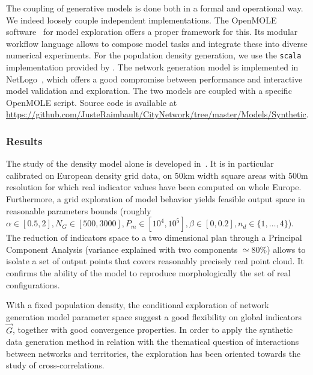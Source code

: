 \documentclass{article}
\begin{document}
The coupling of generative models is done both in a formal and operational way. We indeed loosely couple independent implementations. The OpenMOLE software~\cite{reuillon2013openmole} for model exploration offers a proper framework for this. Its modular workflow language allows to compose model tasks and integrate these into diverse numerical experiments. For the population density generation, we use the \texttt{scala} implementation provided by \cite{raimbault2018calibration}. The network generation model is implemented in NetLogo~\cite{wilensky1999netlogo}, which offers a good compromise between performance and interactive model validation and exploration. The two models are coupled with a specific OpenMOLE script. Source code is available at \url{https://github.com/JusteRaimbault/CityNetwork/tree/master/Models/Synthetic}.





\subsubsection*{Results}

The study of the density model alone is developed in~\cite{raimbault2018calibration}. It is in particular calibrated on European density grid data, on 50km width square areas with 500m resolution for which real indicator values have been computed on whole Europe. Furthermore, a grid exploration of model behavior yields feasible output space in reasonable parameters bounds (roughly $\alpha \in [0.5,2],N_G\in [500,3000], P_m \in [10^4,10^5],\beta\in [0,0.2], n_d \in \{ 1, \ldots , 4\}$). The reduction of indicators space to a two dimensional plan through a Principal Component Analysis (variance explained with two components $\simeq 80\%$) allows to isolate a set of output points that covers reasonably precisely real point cloud. It confirms the ability of the model to reproduce morphologically the set of real configurations.



With a fixed population density, the conditional exploration of network generation model parameter space suggest a good flexibility on global indicators $\vec{G}$, together with good convergence properties. In order to apply the synthetic data generation method in relation with the thematical question of interactions between networks and territories, the exploration has been oriented towards the study of cross-correlations.
\end{document}
